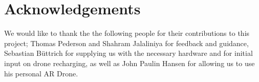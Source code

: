\section{Acknowledgements}
We would like to thank the the following people for their contributions to this project; Thomas Pederson and Shahram Jalaliniya for feedback and guidance, Sebastian B\"uttrich for supplying us with the necessary hardware and for initial input on drone recharging, as well as John Paulin Hansen for allowing us to use his personal AR Drone.